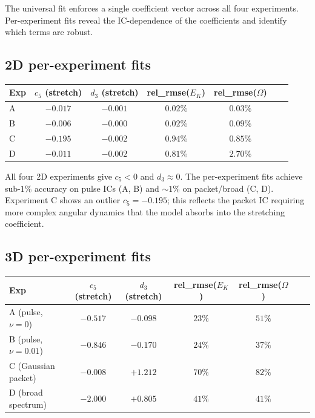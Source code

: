 \documentclass[11pt,a4paper]{article}
\theoremstyle{remark}
\begin{document}
The universal fit enforces a single coefficient vector across all four experiments.  Per-experiment fits reveal the IC-dependence of the coefficients and identify which terms are robust.

\subsection{2D per-experiment fits}

\begin{center}
\begin{tabular}{lcccccc}
\toprule
Exp & $c_5$ (stretch) & $d_3$ (stretch) & rel\_rmse($E_K$) & rel\_rmse($\Omega$) \\
\midrule
A & $-0.017$ & $-0.001$ & $0.02\%$ & $0.03\%$ \\
B & $-0.006$ & $-0.000$ & $0.02\%$ & $0.09\%$ \\
C & $-0.195$ & $-0.002$ & $0.94\%$ & $0.85\%$ \\
D & $-0.011$ & $-0.002$ & $0.81\%$ & $2.70\%$ \\
\bottomrule
\end{tabular}
\end{center}

All four 2D experiments give $c_5 < 0$ and $d_3 \approx 0$.  The per-experiment fits achieve sub-$1\%$ accuracy on pulse ICs (A, B) and $\sim 1\%$ on packet/broad (C, D).  Experiment C shows an outlier $c_5 = -0.195$; this reflects the packet IC requiring more complex angular dynamics that the model absorbs into the stretching coefficient.

\subsection{3D per-experiment fits}

\begin{center}
\begin{tabular}{lcccccc}
\toprule
Exp & $c_5$ (stretch) & $d_3$ (stretch) & rel\_rmse($E_K$) & rel\_rmse($\Omega$) \\
\midrule
A (pulse, $\nu=0$)     & $-0.517$ & $-0.098$ & $23\%$ & $51\%$ \\
B (pulse, $\nu=0.01$)  & $-0.846$ & $-0.170$ & $24\%$ & $37\%$ \\
C (Gaussian packet)     & $-0.008$ & $+1.212$ & $70\%$ & $82\%$ \\
D (broad spectrum)      & $-2.000$ & $+0.805$ & $41\%$ & $41\%$ \\
\bottomrule
\end{tabular}
\end{center}
\end{document}
